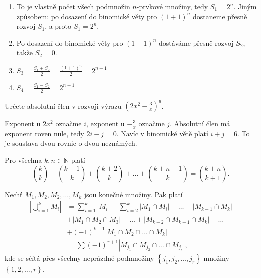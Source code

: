 \begin{reseni}
\begin{enumerate}[$i.$]
\item To je vlastně počet všech podmnožin $n$-prvkové množiny, tedy $S_1=2^n$. Jiným
způsobem: po dosazení do binomické věty pro $(1+1)^n$ dostaneme přesně rozvoj $S_1$,
a proto $S_1=2^n.$
\item Po dosazení do binomické věty pro $(1-1)^n$ dostáváme přesně rozvoj $S_2$,
takže $S_2=0.$
\item $S_3=\frac{S_1+S_2}{2}=\frac{(1+1)^n}{2}=2^{n-1}$
\item $S_4=\frac{S_1-S_2}{2}=2^{n-1}$
\end{enumerate}
\end{reseni}

\begin{priklad}
Určete absolutní člen v rozvoji výrazu $(2x^2-\frac{3}{x})^6$.
\end{priklad}

\begin{reseni}
Exponent u $2x^2$ označme $i$, exponent u $-\frac{3}{x}$ označme $j$. Absolutní člen má
exponent roven nule, tedy $2i-j=0$. Navíc v binomické větě platí $i+j=6$. To je
soustava dvou rovnic o dvou neznámých.
\end{reseni}

\begin{veta}
    Pro všechna $k,n \in \mathbb N$ platí
    $$\binom{k}{k} + \binom{k+1}{k}+\binom{k+2}{k}+\dots + \binom{k+n-1}{k}=
    \binom{k+n}{k+1}.$$
\end{veta}

\begin{veta}
    Nechť $M_1, M_2, M_2, \dots, M_k$ jsou konečné množiny. Pak platí
    \begin{align*}
        \left | \bigcup_{i=1}^k M_i \right | &= \sum_{i=1}^k \left | M_i \right |
        - \sum_{i=2}^k \left | M_1 \cap M_i \right | - \dots
        - \left | M_{k-1}\cap M_k \right | \\
        &+ \left | M_1\cap M_2 \cap M_3 \right | + \dots +
        \left | M_{k-2}\cap M_{k-1} \cap M_k \right | - \dots \\
        & + (-1)^{k+1} \left | M_1\cap M_2 \cap \dots \cap M_k \right |\\
        &= \sum (-1)^{r+1} \left | M_{j_1}\cap M_{j_2} \cap \dots \cap M_{j_r} \right |,
    \end{align*}
    kde se sčítá přes všechny neprázdné podmnožiny $\left \{ j_1, j_2, \dots,
   j_r \right \} $ množiny $\left \{ 1,2,\dots, r \right \}$.
\end{veta}


